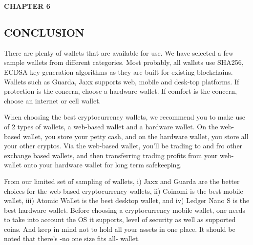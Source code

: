 \documentclass[12pt]{article}
\begin{document}
\begin{flushleft}\textbf{CHAPTER 6} \end{flushleft}
\begin{flushleft}\section{CONCLUSION} \end{flushleft}

      There are plenty of wallets that are available for use. We
have selected a few sample wallets from different
categories. Most probably, all wallets use SHA256,
ECDSA key generation algorithms as they are built for
existing blockchains. Wallets such as Guarda, Jaxx
supports web, mobile and desk-top platforms. If protection
is the concern, choose a hardware wallet. If comfort is the
concern, choose an internet or cell wallet.\par
When choosing the best cryptocurrency wallets, we recommend you to make use of 2 types of wallets, a web-based
wallet and a hardware wallet. On the web-based wallet, you
store your petty cash, and on the hardware wallet, you store
all your other cryptos. Via the web-based wallet, you’ll be
trading to and fro other exchange based wallets, and then
transferring trading profits from your web-wallet onto your
hardware wallet for long term safekeeping.\par
From our limited set of sampling of wallets, i) Jaxx and
Guarda are the better choices for the web based
cryptocurrency wallets, ii) Coinomi is the best mobile
wallet, iii) Atomic Wallet is the best desktop wallet, and iv)
Ledger Nano S is the best hardware wallet. Before choosing
a cryptocurrency mobile wallet, one needs to take into
account the OS it supports, level of security as well as
supported coins. And keep in mind not to hold all your
assets in one place. It should be noted that there’s -no one
size fits all- wallet.
\end{document}
